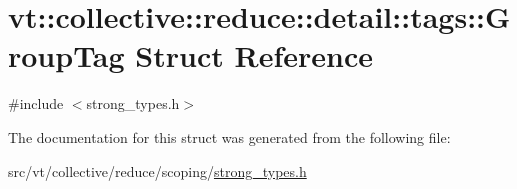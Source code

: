 \hypertarget{structvt_1_1collective_1_1reduce_1_1detail_1_1tags_1_1_group_tag}{}\section{vt\+:\+:collective\+:\+:reduce\+:\+:detail\+:\+:tags\+:\+:Group\+Tag Struct Reference}
\label{structvt_1_1collective_1_1reduce_1_1detail_1_1tags_1_1_group_tag}


{\ttfamily \#include $<$strong\+\_\+types.\+h$>$}



The documentation for this struct was generated from the following file\+:\begin{DoxyCompactItemize}
\item 
src/vt/collective/reduce/scoping/\hyperlink{strong__types_8h}{strong\+\_\+types.\+h}\end{DoxyCompactItemize}

